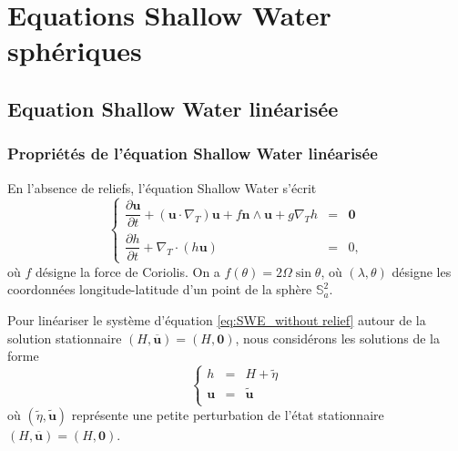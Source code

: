 \chapter{Equations Shallow Water sphériques}

\section{Equation Shallow Water linéarisée}

\subsection{Propriétés de l'équation Shallow Water linéarisée}

En l'absence de reliefs, l'équation Shallow Water s'écrit
\begin{equation}
\label{eq:SWE_without relief}
\left\lbrace
\begin{array}{rcl}
\dfrac{\partial \mathbf{u}}{\partial t} + \left( \mathbf{u} \cdot \nabla_T \right) \mathbf{u} + f \mathbf{n} \wedge \mathbf{u} + g \nabla_T h & = & \mathbf{0} \\
\dfrac{\partial h}{\partial t} + \nabla_T \cdot \left( h \mathbf{u} \right) & = & 0,
\end{array}
\right.
\end{equation}
où $f$ désigne la force de Coriolis. On a $f(\theta) = 2 \Omega \sin \theta$, où $(\lambda,\theta)$ désigne les coordonnées longitude-latitude d'un point de la sphère $\mathbb{S}_a^2$.

Pour linéariser le système d'équation \eqref{eq:SWE_without relief} autour de la solution stationnaire $(H, \overline{\mathbf{u}}) = (H,\mathbf{0})$, nous considérons les solutions de la forme
\begin{equation}
\left\lbrace
\begin{array}{rcl}
h & = & H + \tilde{\eta} \\
\mathbf{u} & = & \tilde{\mathbf{u}} \\
\end{array}
\right.
\end{equation}
où $(\tilde{\eta}, \tilde{\mathbf{u}})$ représente une petite perturbation de l'état stationnaire  $(H, \overline{\mathbf{u}}) = (H,\mathbf{0})$.

